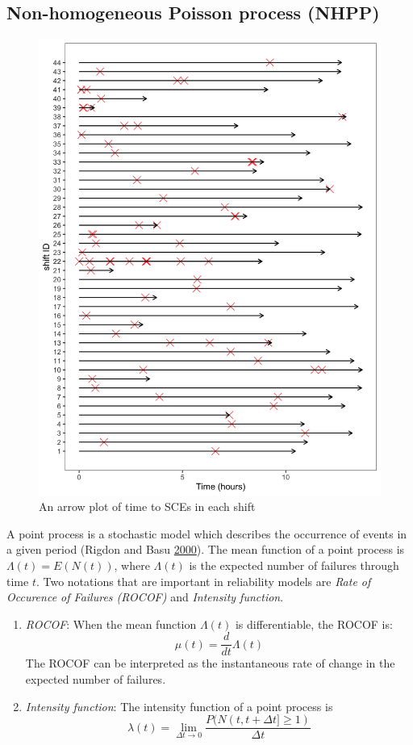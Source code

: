 \documentclass[12pt]{book}
\numberwithin{equation}{chapter}
\begin{document}
\hypertarget{non-homogeneous-poisson-process-nhpp}{%
\subsection{Non-homogeneous Poisson process (NHPP)}\label{non-homogeneous-poisson-process-nhpp}}

\begin{figure}[H]

{\centering \includegraphics[width=0.5\linewidth]{figs/NHPP_arrow_plot} 

}

\caption{An arrow plot of time to SCEs in each shift}\label{fig:arrowplot}
\end{figure}

A point process is a stochastic model which describes the occurrence of events in a given period (Rigdon and Basu \protect\hyperlink{ref-rigdon2000statistical}{2000}). The mean function of a point process is \(\Lambda(t) = E(N(t))\), where \(\Lambda(t)\) is the expected number of failures through time \(t\). Two notations that are important in reliability models are \emph{Rate of Occurence of Failures (ROCOF)} and \emph{Intensity function}.

\begin{enumerate}
\def\labelenumi{\arabic{enumi}.}
\item
  \emph{ROCOF}: When the mean function \(\Lambda(t)\) is differentiable, the ROCOF is:
  \[\mu(t) = \frac{d}{dt}\Lambda(t)\]
  The ROCOF can be interpreted as the instantaneous rate of change in the expected number of failures.
\item
  \emph{Intensity function}: The intensity function of a point process is
  \[\lambda(t) = \lim_{\Delta t \rightarrow 0}\frac{P(N(t, t+\Delta t] \geq 1)}{\Delta t}\]
\end{enumerate}
\end{document}

